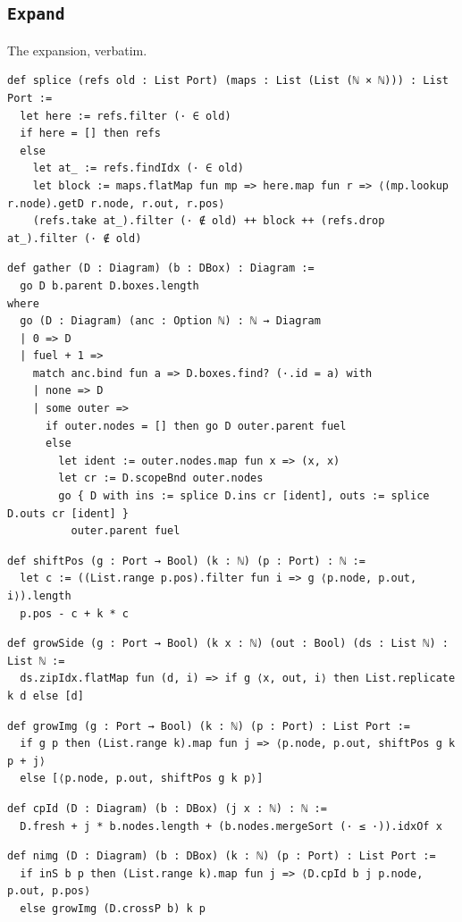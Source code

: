 \subsection{\texttt{Expand}}
The expansion, verbatim.
\begin{lstlisting}[style=leancore]
def splice (refs old : List Port) (maps : List (List (ℕ × ℕ))) : List Port :=
  let here := refs.filter (· ∈ old)
  if here = [] then refs
  else
    let at_ := refs.findIdx (· ∈ old)
    let block := maps.flatMap fun mp => here.map fun r => ⟨(mp.lookup r.node).getD r.node, r.out, r.pos⟩
    (refs.take at_).filter (· ∉ old) ++ block ++ (refs.drop at_).filter (· ∉ old)
\end{lstlisting}
\begin{lstlisting}[style=leancore]
def gather (D : Diagram) (b : DBox) : Diagram :=
  go D b.parent D.boxes.length
where
  go (D : Diagram) (anc : Option ℕ) : ℕ → Diagram
  | 0 => D
  | fuel + 1 =>
    match anc.bind fun a => D.boxes.find? (·.id = a) with
    | none => D
    | some outer =>
      if outer.nodes = [] then go D outer.parent fuel
      else
        let ident := outer.nodes.map fun x => (x, x)
        let cr := D.scopeBnd outer.nodes
        go { D with ins := splice D.ins cr [ident], outs := splice D.outs cr [ident] }
          outer.parent fuel
\end{lstlisting}
\begin{lstlisting}[style=leancore]
def shiftPos (g : Port → Bool) (k : ℕ) (p : Port) : ℕ :=
  let c := ((List.range p.pos).filter fun i => g ⟨p.node, p.out, i⟩).length
  p.pos - c + k * c
\end{lstlisting}
\begin{lstlisting}[style=leancore]
def growSide (g : Port → Bool) (k x : ℕ) (out : Bool) (ds : List ℕ) : List ℕ :=
  ds.zipIdx.flatMap fun (d, i) => if g ⟨x, out, i⟩ then List.replicate k d else [d]
\end{lstlisting}
\begin{lstlisting}[style=leancore]
def growImg (g : Port → Bool) (k : ℕ) (p : Port) : List Port :=
  if g p then (List.range k).map fun j => ⟨p.node, p.out, shiftPos g k p + j⟩
  else [⟨p.node, p.out, shiftPos g k p⟩]
\end{lstlisting}
\begin{lstlisting}[style=leancore]
def cpId (D : Diagram) (b : DBox) (j x : ℕ) : ℕ :=
  D.fresh + j * b.nodes.length + (b.nodes.mergeSort (· ≤ ·)).idxOf x
\end{lstlisting}
\begin{lstlisting}[style=leancore]
def nimg (D : Diagram) (b : DBox) (k : ℕ) (p : Port) : List Port :=
  if inS b p then (List.range k).map fun j => ⟨D.cpId b j p.node, p.out, p.pos⟩
  else growImg (D.crossP b) k p
\end{lstlisting}
